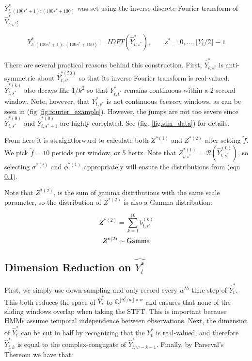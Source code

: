 $Y^*_{t,(100s^*+1):(100s^*+100)}$ was set using the inverse discrete Fourier transform of $\hat{Y}^*_{t,s^*}$:

$$Y^*_{t,(100s^*+1):(100s^*+100)} = IDFT\left(\hat{Y}^*_{t,s^*}\right), \qquad s^* = 0,\ldots,\lfloor Y_t/2 \rfloor - 1$$

There are several practical reasons behind this construction. First, $\hat{Y}^*_{t,s^*}$ is anti-symmetric about $\hat{Y}^{*(50)}_{t,s^*}$ so that its inverse Fourier transform is real-valued. $\hat{Y}^{*(k)}_{t,s^*}$ also decays like $1/k^2$ so that $Y^*_{t,t^*}$ remains continuous within a 2-second window. Note, however, that $Y^*_{t,s^*}$ is not continuous \textit{between} windows, as can be seen in (fig \ref{fig:fourier_example}). However, the jumps are not too severe since $\hat{Y}^{*(0)}_{t,s^*}$ and $\hat{Y}^{*(0)}_{t,s^*+1}$ are highly correlated. See (fig. \ref{fig:sim_data}) for details.

From here it is straightforward to calculate both $Z^{*(1)}$ and $Z^{*(2)}$ after setting $\tilde{f}$. We pick $\tilde{f} = 10$ periods per window, or 5 hertz. Note that $Z^{*(1)}_{t,s^*} = \mathcal{R}\left(\hat{Y}^{(0)}_{t,s^*}\right)$, so selecting $\sigma^{*(i)}$ and $\phi^{*(1)}$ appropriately will ensure the distributions from (eqn \ref{}). 

Note that $Z^{*(2)}$, is the sum of gamma distributions with the same scale parameter, so the distribution of $Z^{*(2)}$ is also a Gamma distribution:

$$Z^{*(2)} = \sum_{k=1}^{10} b^{(k)}_{t,s^*}$$
$$Z^{*(2)} \sim {\rm{Gamma}}$$


























\iffalse


\subsection{Dimension Reduction on $\hat{Y_t^*}$}

First, we simply use down-sampling and only record every $w^{th}$ time step of $\hat{Y}_t^*$. This both reduces the space of $\hat{Y}_t^*$ to $\mathbb{C}^{\lfloor S^*_t / w \rfloor \times w}$ and ensures that none of the sliding windows overlap when taking the STFT. This is important because HMMs assume temporal independence between observations. Next, the dimension of $\hat{Y}_t^*$ can be cut in half by recognizing that the $Y_t^*$ is real-valued, and therefore $\hat{Y}_{t,k}^*$ is equal to the complex-congugate of $\hat{Y}_{t,w-k-1}^*$. Finally, by Parseval's Thereom we have that:

